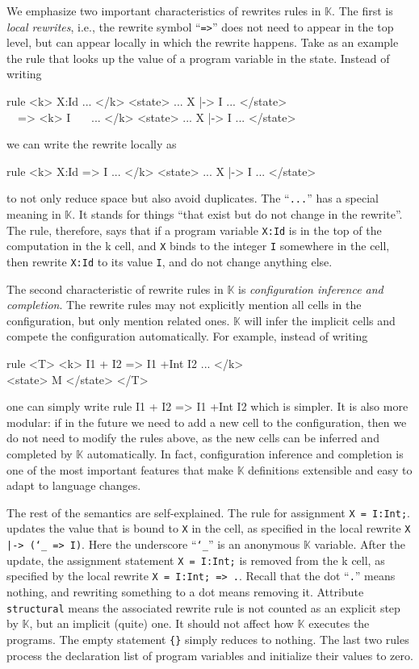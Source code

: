 \documentclass[acmsmall,review,anonymous]{acmart}
\newcommand{\K}{$\mathbb{K}$\xspace}
\newcommand{\sfk}{\textsf{k}\xspace}
\begin{document}
We emphasize two important characteristics of rewrites rules in \K.
The first is \emph{local rewrites}, i.e., 
the rewrite symbol ``\texttt{=>}'' does not need
to appear in the top level, but can appear locally
in which the rewrite happens.
Take as an example 
the rule that looks up the value of a program variable in the state. 
Instead of writing
\begin{center}
	\ttfamily\footnotesize
	rule <k> X:Id ... </k> <state> ... X |-> I ... </state> \\
	\ \ => <k> I \ \ \  ... </k> <state> ... X |-> I ... </state>
\end{center}
we can write the rewrite locally as
\begin{center}
	\ttfamily\footnotesize
	rule <k> X:Id => I ... </k> <state> ... X |-> I ... </state>
\end{center}
to not only reduce space but also avoid duplicates.
The ``\texttt{...}'' has a special meaning in \K.
It stands for things
``that exist but do not change in the rewrite''.
The rule, therefore, 
says that if a program variable \texttt{X:Id}
is in the top of the computation in the \sfk cell, 
and \texttt{X} binds to the integer \texttt{I} 
somewhere in the \state cell,
then rewrite \texttt{X:Id} to its value \texttt{I}, and do not change
anything else.

The second characteristic of rewrite rules in \K is 
\emph{configuration inference and completion}.
The rewrite rules may not explicitly mention all cells in the configuration,
but only mention related ones. 
\K will infer the implicit cells and compete
the configuration automatically.
For example, instead of writing
\begin{center}
	\ttfamily\footnotesize
	rule <T> <k> I1 + I2 => I1 +Int I2 ... </k> \\
	<state> M </state>  </T>
\end{center}
one can simply write
{
	\ttfamily\footnotesize
	rule I1 + I2 => I1 +Int I2
}
which is simpler.
It is also more modular:
if in the future we need to add a new cell to the configuration,
then we do not need to modify the rules above, as the new cells
can be inferred and completed by \K automatically.
In fact, configuration inference and completion
is one of the most important features that make
\K definitions extensible and easy to adapt
to language changes.

The rest of the semantics are self-explained.
The rule for assignment \texttt{X = I:Int;}.
updates the value that is bound to
\texttt{X} in the \state cell, as specified in the local rewrite 
\texttt{X |-> ({\char`_} => I)}.
Here the underscore
``\texttt{\char`_}'' is an anonymous \K variable.
After the update, the assignment statement \texttt{X = I:Int;} is removed
from the \sfk cell, as specified by the local rewrite
\texttt{X = I:Int; => .}.
Recall that the dot ``\texttt{.}'' means nothing, 
and rewriting something to a dot means removing it.
Attribute \texttt{structural} means the associated rewrite rule is not
counted as an explicit step by \K, but an implicit (quite) one.
It should not affect how \K executes the programs.
The empty statement \verb|{}| simply reduces to nothing.
The last two rules process the declaration list of program variables
and initialize their values to zero.
\end{document}
